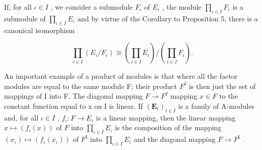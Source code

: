 If, for all \(\iota \in I\) , we consider a submodule \(F_{\iota}\) of \(E_{\iota}\) , the module \(\prod_{\iota \in I} F_{\iota}\) is a submodule of \(\prod_{\iota \in I} E_{\iota}\) and by virtue of the Corollary to Proposition 5, there is a canonical isomorphism

\[
\prod_ {i \in I} \left(E _ {i} / F _ {i}\right)\cong \left(\prod_ {i \in I} E _ {i}\right) / \left(\prod_ {i \in I} F _ {i}\right).\tag{19}
\]

An important example of a product of modules is that where all the factor modules are equal to the same module F; their product \(F^{I}\) is then just the set of mappings of I into F. The diagonal mapping \(F \rightarrow F^{I}\) mapping \(x \in F\) to the constant function equal to x on I is linear. If \((\mathbf{E}_{t})_{t \in I}\) is a family of A-modules and, for all \(\iota \in I\) , \(f_{\iota}: F \to E_{\iota}\) is a linear mapping, then the linear mapping \(x \mapsto (f_{\iota}(x))\) of \(F\) into \(\prod_{\iota \in I} E_{\iota}\) is the composition of the mapping \((x_{\iota}) \mapsto (f_{\iota}(x_{\iota}))\) of \(F^{\mathrm{I}}\) into \(\prod_{\iota \in I} E_{\iota}\) and the diagonal mapping \(F \to F^{\mathrm{I}}\) .

